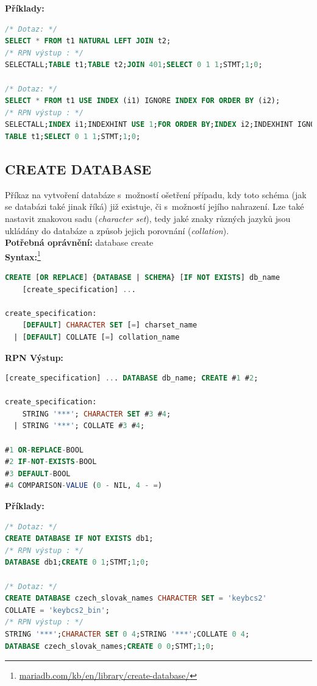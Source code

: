 \vspace*{\baselineskip}
\textbf{Příklady:}
\begin{lstlisting}[language=sql]
/* Dotaz: */
SELECT * FROM t1 NATURAL LEFT JOIN t2;
/* RPN výstup : */
SELECTALL;TABLE t1;TABLE t2;JOIN 401;SELECT 0 1 1;STMT;1;0;

/* Dotaz: */
SELECT * FROM t1 USE INDEX (i1) IGNORE INDEX FOR ORDER BY (i2);
/* RPN výstup : */
SELECTALL;INDEX i1;INDEXHINT USE 1;FOR ORDER BY;INDEX i2;INDEXHINT IGNORE 1;
TABLE t1;SELECT 0 1 1;STMT;1;0;
\end{lstlisting}

\subsection{CREATE DATABASE} \label{subsec:6:createdb}
Příkaz na vytvoření databáze s~možností ošetření případu, kdy toto schéma (jak se databázi také jinak říká) již existuje, či s~možností jejího nahrazení. 
Lze také nastavit znakovou sadu (\textit{character set}), tedy jaké znaky různých jazyků jsou ukládány do databáze a způsob jejich porovnání 
(\textit{collation}). \\

\textbf{Potřebná oprávnění:} database create \\

\textbf{Syntax:}\footnote{\url{mariadb.com/kb/en/library/create-database/}}
\begin{lstlisting}[language=sql]
CREATE [OR REPLACE] {DATABASE | SCHEMA} [IF NOT EXISTS] db_name
    [create_specification] ...

create_specification:
    [DEFAULT] CHARACTER SET [=] charset_name
  | [DEFAULT] COLLATE [=] collation_name
\end{lstlisting}
\vspace*{\baselineskip}
\textbf{RPN Výstup:}
\begin{lstlisting}[language=sql]
[create_specification] ... DATABASE db_name; CREATE #1 #2;

create_specification:
    STRING '***'; CHARACTER SET #3 #4;
  | STRING '***'; COLLATE #3 #4;

#1 OR-REPLACE-BOOL
#2 IF-NOT-EXISTS-BOOL
#3 DEFAULT-BOOL
#4 COMPARISON-VALUE (0 - NIL, 4 - =)
\end{lstlisting}
\vspace*{\baselineskip}
\textbf{Příklady:}
\begin{lstlisting}[language=sql]
/* Dotaz: */
CREATE DATABASE IF NOT EXISTS db1;
/* RPN výstup : */
DATABASE db1;CREATE 0 1;STMT;1;0;

/* Dotaz: */
CREATE DATABASE czech_slovak_names CHARACTER SET = 'keybcs2' 
COLLATE = 'keybcs2_bin';
/* RPN výstup : */
STRING '***';CHARACTER SET 0 4;STRING '***';COLLATE 0 4;
DATABASE czech_slovak_names;CREATE 0 0;STMT;1;0;
\end{lstlisting}

